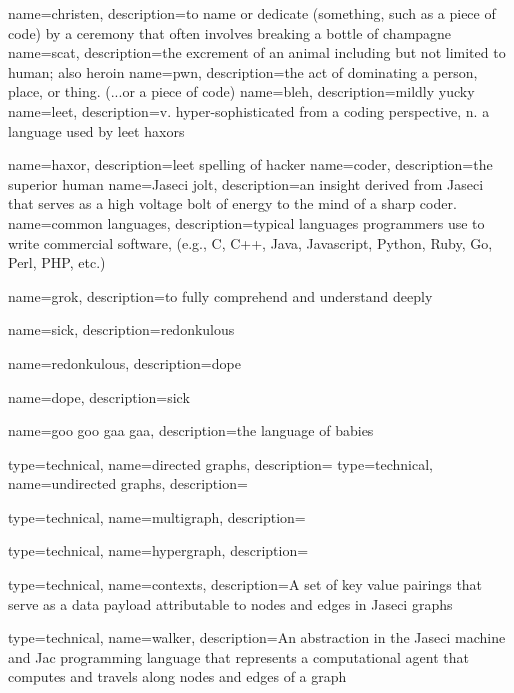 {
    name=christen,
    description={to name or dedicate (something, such as a piece of code) by a ceremony that often involves breaking a bottle of champagne}
}
{
    name=scat,
    description={the excrement of an animal including but not limited to human; also heroin }
}
{
    name=pwn,
    description={the act of dominating a person, place, or thing. (...or a piece of code)}
}
{
    name=bleh,
    description={mildly yucky}
}
{
    name=leet,
    description={v. hyper-sophisticated from a coding perspective, n. a language used by \gls{leet} \gls{haxor}s}
}

{
    name=haxor,
    description={\gls{leet} spelling of hacker}
}
{
    name=coder,
    description={the superior human}
}
{
    name=Jaseci jolt,
    description={an insight derived from Jaseci that serves as a high voltage bolt of energy to the mind of a sharp coder.}
}
{
    name=common languages,
    description={typical languages programmers use to write commercial software, (e.g., C, C++, Java, Javascript, Python, Ruby, Go, Perl, PHP, etc.)}
}

{
    name=grok,
    description={to fully comprehend and understand deeply }
}

{
    name=sick,
    description={\gls{redonkulous}}
}

{
    name=redonkulous,
    description={\gls{dope}}
}

{
    name=dope,
    description={\gls{sick}}
}

{
    name=goo goo gaa gaa,
    description={the language of babies}
}

{
    type=technical,
    name=directed graphs,
    description={}
}
{
    type=technical,
    name=undirected graphs,
    description={}
}

{
    type=technical,
    name=multigraph,
    description={}
}

{
    type=technical,
    name=hypergraph,
    description={}
}

{
    type=technical,
    name=contexts,
    description={A set of key value pairings that serve as a data payload attributable to nodes and edges in Jaseci graphs}
}

{
    type=technical,
    name=walker,
    description={An abstraction in the Jaseci machine and Jac programming language that represents a computational agent that computes and travels along nodes and edges of a graph}
}
